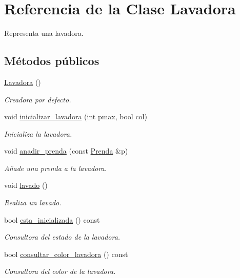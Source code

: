 \hypertarget{class_lavadora}{\section{Referencia de la Clase Lavadora}
\label{class_lavadora}
}


Representa una lavadora.  


\subsection*{Métodos públicos}
\begin{DoxyCompactItemize}
\item 
\hyperlink{class_lavadora_a2366b1cd0ba86f8ef8ba8504067dc114}{Lavadora} ()
\begin{DoxyCompactList}\small\item\em Creadora por defecto. \end{DoxyCompactList}\item 
void \hyperlink{class_lavadora_ad43871786bb680e22552103bc23adc71}{inicializar\-\_\-lavadora} (int pmax, bool col)
\begin{DoxyCompactList}\small\item\em Inicializa la lavadora. \end{DoxyCompactList}\item 
void \hyperlink{class_lavadora_a7e465e1f11ba5ba3cffcee1ce9507e79}{anadir\-\_\-prenda} (const \hyperlink{class_prenda}{Prenda} \&p)
\begin{DoxyCompactList}\small\item\em Añade una prenda a la lavadora. \end{DoxyCompactList}\item 
void \hyperlink{class_lavadora_a82bd403e688482030fcb95f0c3fd62d1}{lavado} ()
\begin{DoxyCompactList}\small\item\em Realiza un lavado. \end{DoxyCompactList}\item 
bool \hyperlink{class_lavadora_a0788f5869b65672123a0f53f278b6165}{esta\-\_\-inicializada} () const 
\begin{DoxyCompactList}\small\item\em Consultora del estado de la lavadora. \end{DoxyCompactList}\item 
bool \hyperlink{class_lavadora_a184836a74d8df69e21991c2873a613e1}{consultar\-\_\-color\-\_\-lavadora} () const 
\begin{DoxyCompactList}\small\item\em Consultora del color de la lavadora. \end{DoxyCompactList}\item 

\end{DoxyCompactItemize}
